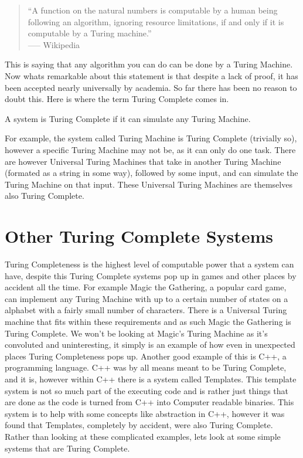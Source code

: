 \documentclass{article}
\begin{document}
	\begin{quote}
		``A function on the natural numbers is computable by a human being following an algorithm, ignoring resource limitations, if and only if it is computable by a Turing machine.'' \\
		----- Wikipedia
	\end{quote}
	
	This is saying that any algorithm you can do can be done by a Turing Machine. Now whats remarkable about this statement is that despite a lack of proof, it has been accepted nearly universally by academia. So far there has been no reason to doubt this. Here is where the term Turing Complete comes in.
	
	\begin{definition}
		A system is Turing Complete if it can simulate any Turing Machine.
	\end{definition}
	
	For example, the system called Turing Machine is Turing Complete (trivially so), however a specific Turing Machine may not be, as it can only do one task. There are however Universal Turing Machines that take in another Turing Machine (formated as a string in some way), followed by some input, and can simulate the Turing Machine on that input. These Universal Turing Machines are themselves also Turing Complete.
	
	\section{Other Turing Complete Systems}
	Turing Completeness is the highest level of computable power that a system can have, despite this Turing Complete systems pop up in games and other places by accident all the time. For example Magic the Gathering, a popular card game, can implement any Turing Machine with up to a certain number of states on a alphabet with a fairly small number of characters. There is a Universal Turing machine that fits within these requirements and as such Magic the Gathering is Turing Complete. We won't be looking at Magic's Turing Machine as it's convoluted and uninteresting, it simply is an example of how even in unexpected places Turing Completeness pops up. Another good example of this is C++, a programming language. C++ was by all means meant to be Turing Complete, and it is, however within C++ there is a system called Templates. This template system is not so much part of the executing code and is rather just things that are done as the code is turned from C++ into Computer readable binaries. This system is to help with some concepts like abstraction in C++, however it was found that Templates, completely by accident, were also Turing Complete. Rather than looking at these complicated examples, lets look at some simple systems that are Turing Complete.
	
\end{document}
